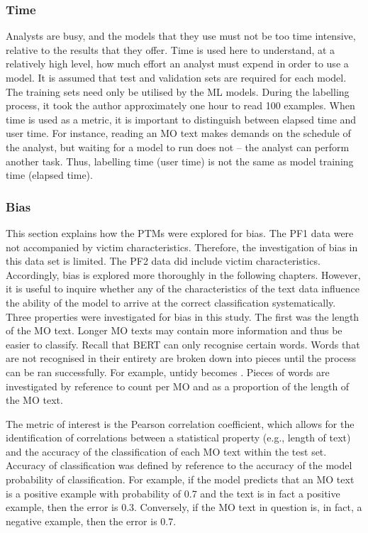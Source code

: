  \subsubsection{Time} Analysts are busy, and the models that they use must not be too time intensive, relative to the results that they offer. Time is used here to understand, at a relatively high level, how much effort an analyst must expend in order to use a model. It is assumed that test and validation sets are required for each model. The training sets need only be utilised by the ML models. During the labelling process, it took the author approximately one hour to read 100 examples. When time is used as a metric, it is important to distinguish between elapsed time and user time. For instance, reading an MO text makes demands on the schedule of the analyst, but waiting for a model to run does not – the analyst can perform another task. Thus, labelling time (user time) is not the same as model training time (elapsed time).
 
\subsubsection{Bias} \label{study1-bias}This section explains how the PTMs were explored for bias. The PF1 data were not accompanied by victim characteristics. Therefore, the investigation of bias in this data set is limited. The PF2 data did include victim characteristics. Accordingly, bias is explored more thoroughly in the following chapters. However, it is useful to inquire whether any of the characteristics of the text data influence the ability of the model to arrive at the correct classification systematically. Three properties were investigated for bias in this study. The first was the length of the MO text. Longer MO texts may contain more information and thus be easier to classify. Recall that BERT can only recognise certain words. Words that are not recognised in their entirety are broken down into pieces until the process can be ran successfully. For example, untidy becomes .  Pieces of words are investigated by reference to count per MO and as a proportion of the length of the MO text.

The metric of interest is the Pearson correlation coefficient, which allows for the identification of correlations between a statistical property (e.g., length of text) and the accuracy of the classification of each MO text within the test set. Accuracy of classification was defined by reference to the accuracy of the model probability of classification. For example, if the model predicts that an MO text is a positive example with probability of 0.7 and the text is in fact a positive example, then the error is 0.3. Conversely, if the MO text in question is, in fact, a negative example, then the error is 0.7.

